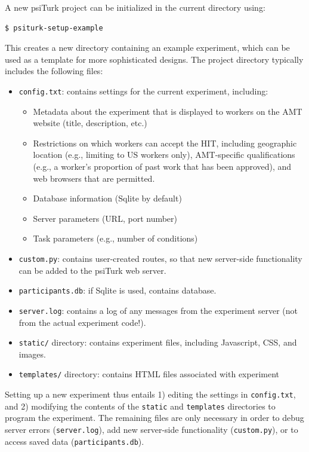 \documentclass[twocolumn]{svjour3}          %
\begin{document}
A new \textsf{psiTurk} project can be initialized in the current directory using:

\begin{lstlisting}
$ psiturk-setup-example
\end{lstlisting}

\noindent This creates a new directory containing an example experiment,
which can be used as a template for more sophisticated designs.
The project directory typically includes the following files: 

\begin{itemize}
\item \texttt{config.txt}: contains settings for the current experiment, including:

\begin{itemize}
\item Metadata about the experiment that is displayed to workers on the AMT website (title, description, etc.)
\item Restrictions on which workers can accept the HIT, including geographic location (e.g., limiting to US workers only), AMT-specific qualifications (e.g., a worker's proportion of past work that has been approved), and web browsers that are permitted.
\item Database information (Sqlite by default)
\item Server parameters (URL, port number)
\item Task parameters (e.g., number of conditions)
\end{itemize}


\item \texttt{custom.py}: contains user-created routes, so that new server-side functionality can be added to the psiTurk web server. 

\item \texttt{participants.db}: if Sqlite is used, contains database.

\item \texttt{server.log}: contains a log of any messages from the experiment server (not from the actual experiment code!).

\item \texttt{static/} directory: contains experiment files, including Javascript, CSS, and images.

\item \texttt{templates/} directory: contains HTML files associated with experiment 
\end{itemize}

Setting up a new experiment thus entails 1) editing the settings in \texttt{config.txt}, and 2) modifying the contents of the \texttt{static} and \texttt{templates} directories to program the experiment.
The remaining files are only necessary in order to debug server errors (\texttt{server.log}), add new server-side functionality (\texttt{custom.py}), or to access saved data (\texttt{participants.db}).
\end{document}
